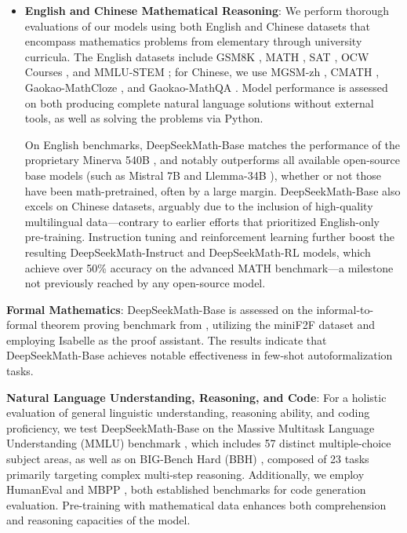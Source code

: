 \begin{itemize}[topsep=0pt]
    \item \textbf{English and Chinese Mathematical Reasoning}: We perform thorough evaluations of our models using both English and Chinese datasets that encompass mathematics problems from elementary through university curricula. The English datasets include GSM8K \citep{gsm8k}, MATH \citep{MATH}, SAT \citep{llemma}, OCW Courses \citep{minerva}, and MMLU-STEM \citep{mmlu}; for Chinese, we use MGSM-zh \citep{mgsm}, CMATH \citep{wei2023cmath}, Gaokao-MathCloze \citep{agieval}, and Gaokao-MathQA \citep{agieval}. Model performance is assessed on both producing complete natural language solutions without external tools, as well as solving the problems via Python.

    On English benchmarks, DeepSeekMath-Base matches the performance of the proprietary Minerva 540B \citep{minerva}, and notably outperforms all available open-source base models (such as Mistral 7B \citep{mistral} and Llemma-34B \citep{llemma}), whether or not those have been math-pretrained, often by a large margin. DeepSeekMath-Base also excels on Chinese datasets, arguably due to the inclusion of high-quality multilingual data—contrary to earlier efforts \citep{minerva,llemma} that prioritized English-only pre-training. Instruction tuning and reinforcement learning further boost the resulting DeepSeekMath-Instruct and DeepSeekMath-RL models, which achieve over 50\% accuracy on the advanced MATH benchmark—a milestone not previously reached by any open-source model. 
\end{itemize}

\item \textbf{Formal Mathematics}: DeepSeekMath-Base is assessed on the informal-to-formal theorem proving benchmark from \citep{dsp_proof}, utilizing the miniF2F dataset \citep{minif2f} and employing Isabelle \citep{isabelle} as the proof assistant. The results indicate that DeepSeekMath-Base achieves notable effectiveness in few-shot autoformalization tasks.
\item \textbf{Natural Language Understanding, Reasoning, and Code}: For a holistic evaluation of general linguistic understanding, reasoning ability, and coding proficiency, we test DeepSeekMath-Base on the Massive Multitask Language Understanding (MMLU) benchmark \citep{mmlu}, which includes 57 distinct multiple-choice subject areas, as well as on BIG-Bench Hard (BBH) \citep{bbh}, composed of 23 tasks primarily targeting complex multi-step reasoning. Additionally, we employ HumanEval \citep{codex} and MBPP \citep{mbpp}, both established benchmarks for code generation evaluation. Pre-training with mathematical data enhances both comprehension and reasoning capacities of the model.

